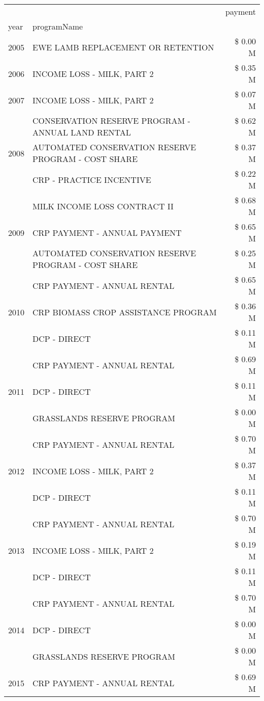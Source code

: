 \begin{tabular}{llr}
\toprule
 &  & payment \\
year & programName &  \\
\midrule
2005 & EWE LAMB REPLACEMENT OR RETENTION & \$ 0.00 M \\
\cline{1-3}
2006 & INCOME LOSS - MILK, PART 2 & \$ 0.35 M \\
\cline{1-3}
2007 & INCOME LOSS - MILK, PART 2 & \$ 0.07 M \\
\cline{1-3}
\multirow[t]{3}{*}{2008} & CONSERVATION RESERVE PROGRAM - ANNUAL LAND RENTAL & \$ 0.62 M \\
 & AUTOMATED CONSERVATION RESERVE PROGRAM - COST SHARE & \$ 0.37 M \\
 & CRP - PRACTICE INCENTIVE & \$ 0.22 M \\
\cline{1-3}
\multirow[t]{3}{*}{2009} & MILK INCOME LOSS CONTRACT II & \$ 0.68 M \\
 & CRP PAYMENT - ANNUAL PAYMENT & \$ 0.65 M \\
 & AUTOMATED CONSERVATION RESERVE PROGRAM - COST SHARE & \$ 0.25 M \\
\cline{1-3}
\multirow[t]{3}{*}{2010} & CRP PAYMENT - ANNUAL RENTAL & \$ 0.65 M \\
 & CRP BIOMASS CROP ASSISTANCE PROGRAM & \$ 0.36 M \\
 & DCP - DIRECT & \$ 0.11 M \\
\cline{1-3}
\multirow[t]{3}{*}{2011} & CRP PAYMENT - ANNUAL RENTAL & \$ 0.69 M \\
 & DCP - DIRECT & \$ 0.11 M \\
 & GRASSLANDS RESERVE PROGRAM & \$ 0.00 M \\
\cline{1-3}
\multirow[t]{3}{*}{2012} & CRP PAYMENT - ANNUAL RENTAL & \$ 0.70 M \\
 & INCOME LOSS - MILK, PART 2 & \$ 0.37 M \\
 & DCP - DIRECT & \$ 0.11 M \\
\cline{1-3}
\multirow[t]{3}{*}{2013} & CRP PAYMENT - ANNUAL RENTAL & \$ 0.70 M \\
 & INCOME LOSS - MILK, PART 2 & \$ 0.19 M \\
 & DCP - DIRECT & \$ 0.11 M \\
\cline{1-3}
\multirow[t]{3}{*}{2014} & CRP PAYMENT - ANNUAL RENTAL & \$ 0.70 M \\
 & DCP - DIRECT & \$ 0.00 M \\
 & GRASSLANDS RESERVE PROGRAM & \$ 0.00 M \\
\cline{1-3}
\multirow[t]{3}{*}{2015} & CRP PAYMENT - ANNUAL RENTAL & \$ 0.69 M \\

\end{tabular}
